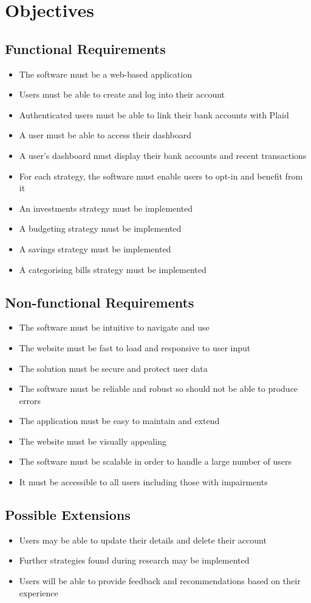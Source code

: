 \section{Objectives}

\subsection{Functional Requirements}
\begin{itemize}
	\item The software must be a web-based application
	\item Users must be able to create and log into their account
	\item Authenticated users must be able to link their bank accounts with Plaid
	\item A user must be able to access their dashboard
	\item A user's dashboard must display their bank accounts and recent transactions
	\item For each strategy, the software must enable users to opt-in and benefit from it 
	\item An investments strategy must be implemented
	\item A budgeting strategy must be implemented
	\item A savings strategy must be implemented
	\item A categorising bills strategy must be implemented
\end{itemize}

\subsection{Non-functional Requirements}
\begin{itemize}
	\item The software must be intuitive to navigate and use
	\item The website must be fast to load and responsive to user input
	\item The solution must be secure and protect user data
	\item The software must be reliable and robust so should not be able to produce errors
	\item The application must be easy to maintain and extend
	\item The website must be visually appealing
	\item The software must be scalable in order to handle a large number of users
	\item It must be accessible to all users including those with impairments
\end{itemize}

\subsection{Possible Extensions}
\begin{itemize}
	\item Users may be able to update their details and delete their account
	\item Further strategies found during research may be implemented
	\item Users will be able to provide feedback and recommendations based on their experience
\end{itemize}